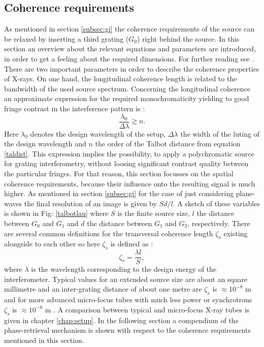 \subsection{Coherence requirements}\label{subsec: coherence}
As mentioned in section \ref{subsec:gi} the coherence requirements of the source can be relaxed by inserting a third grating ($G_{0}$) right behind the source. In this section an overview about the relevant equations and parameters are introduced, in order to get a feeling about the required dimensions. For further reading see \citep{WeitkampPfeiffer2006,Momose2005}. There are two important parameters in order to describe the coherence properties of X-rays. On one hand, the longitudinal coherence length is related to the bandwidth of the used source spectrum. 
Concerning the longitudinal coherence an approximate expression for the required monochromaticity yielding to good fringe contrast in the interference pattern is \citep{Weitkamp2005}: 
\begin{equation}
\frac{\lambda_{0}}{\Delta\lambda} \apprge n. 
\end{equation}
Here $\lambda_{0}$ denotes the design wavelength of the setup, $\Delta\lambda$ the width of the luting of the design wavelength and $n$ the order of the Talbot distance from equation \ref{taldist}. This expression implies the possibility, to apply a polychromatic source for grating interferometry, without loosing significant contrast quality between the particular fringes. For that reason, this section focusses on the spatial coherence requirements, because their influence onto the resulting signal is much higher. As mentioned in section \ref{subsec:gi} for the case of just considering plane-waves the final resolution of an image is given by $S d/l$. A sketch of these variables is shown in Fig: \ref{talbotlau} where $S$ is the finite source size, $l$ the distance between $G_{0}$ and $G_{1}$ and $d$ the distance between $G_{1}$ and $G_{2}$, respectively. There are several common definitions for the transversal coherence length $\zeta_{s}$ existing alongside to each other so here $\zeta_{s}$ is defined as \citep{Weitkamp2005}:
\begin{equation}\label{cohlength}
\zeta_{s} = \frac{\lambda l}{S}, 
\end{equation}
where $\lambda$ is the wavelength corresponding to the design energy of the interferometer. Typical values for an extended source size are about an square millimetre and an inter-grating distance of about one metre are $\zeta_{s}$ is $\approx 10^{-8}$ m and for more advanced micro-focus tubes with much less power or synchrotrons $\zeta_{s}$ is $\approx 10^{-6}$ m  \citep{Pfeiffer2006}. A comparison between typical and micro-focus X-ray tubes is given in chapter \ref{chap:setup}. In the following section a compendium of the phase-retrieval mechanism is shown with respect to the coherence requirements mentioned in this section.          
